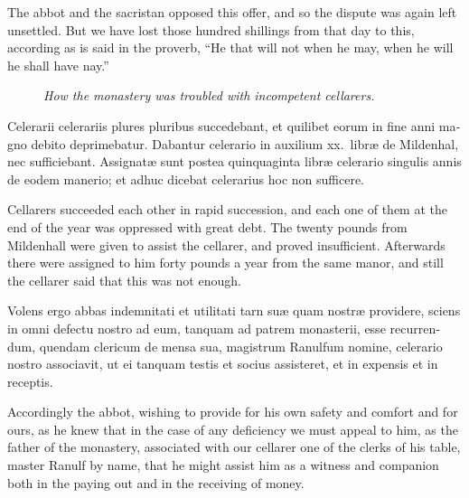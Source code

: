 \documentclass[10pt]{book}
\newcommand{\blockhead}[4][]{
\begin{figure}
\centering
\vspace{#4}
\parbox{2.75cm}{\begin{center}\footnotesize \color{BrickRed} \emph{#2}\\ #1 \end{center}}
\end{figure}
}
\begin{document}
\begin{paracol}{2}
\switchcolumn

The abbot and the sacristan opposed this offer, and so the dispute was again left unsettled. But we have lost those hundred shillings from that day to this, according as is said in the proverb, ``He that will not when he may, when he will he shall have nay.''

\switchcolumn*

\begin{otherlanguage}{latin}
\blockhead{How the monastery was troubled with incompetent cellarers.}{4}{-.45cm}
Celerarii celerariis plures pluribus succedebant, et quilibet eorum in fine anni magno debito deprimebatur. Dabantur celerario in auxilium xx.\ libr\ae{} de Mildenhal, nec sufficiebant. Assignat\ae{} sunt postea quinquaginta libr\ae{} celerario singulis annis de eodem manerio; et adhuc dicebat celerarius hoc non sufficere.

\end{otherlanguage}

\switchcolumn

Cellarers succeeded each other in rapid succession, and each one of them at the end of the year was oppressed with great debt. The twenty pounds from Mildenhall were given to assist the cellarer, and proved insufficient. Afterwards there were assigned to him forty pounds a year from the same manor, and still the cellarer said that this was not enough.

\switchcolumn*

\begin{otherlanguage}{latin}
Volens ergo abbas indemnitati et utilitati tarn su\ae{} quam nostr\ae{} providere, sciens in omni defectu nostro ad eum, tanquam ad patrem monasterii, esse recurrendum, quendam clericum de mensa sua, magistrum Ranulfum nomine, celerario nostro associavit, ut ei tanquam testis et socius assisteret, et in expensis et in receptis.
\end{otherlanguage}

\switchcolumn

Accordingly the abbot, wishing to provide for his own safety and comfort and for ours, as he knew that in the case of any deficiency we must appeal to him, as the father of the monastery, associated with our cellarer one of the clerks of his table, master Ranulf by name, that he might assist him as a witness and companion both in the paying out and in the receiving of money.

\switchcolumn*


\end{paracol}
\end{document}
